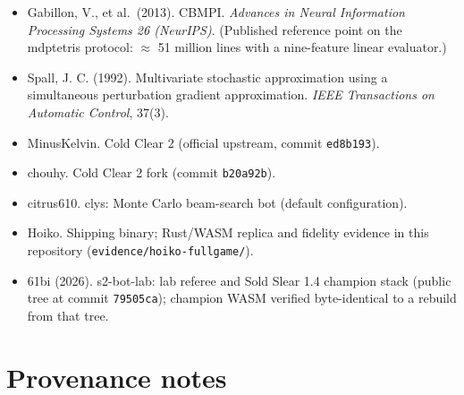 \documentclass[
  11pt,
]{article}
\providecommand{\tightlist}{%
  \setlength{\itemsep}{0pt}\setlength{\parskip}{0pt}}
\begin{document}
\begin{itemize}
\tightlist
\item
  Gabillon, V., et al.~(2013). CBMPI. \emph{Advances in Neural
  Information Processing Systems 26 (NeurIPS)}. (Published reference
  point on the mdptetris protocol: \(\approx\) 51 million lines with a
  nine-feature linear evaluator.)
\item
  Spall, J. C. (1992). Multivariate stochastic approximation using a
  simultaneous perturbation gradient approximation. \emph{IEEE
  Transactions on Automatic Control}, 37(3).
\item
  MinusKelvin. Cold Clear 2 (official upstream, commit
  \texttt{ed8b193}).
\item
  chouhy. Cold Clear 2 fork (commit \texttt{b20a92b}).
\item
  citrus610. clys: Monte Carlo beam-search bot (default configuration).
\item
  Hoiko. Shipping binary; Rust/WASM replica and fidelity evidence in
  this repository (\texttt{evidence/hoiko-fullgame/}).
\item
  61bi (2026). s2-bot-lab: lab referee and Sold Slear 1.4 champion stack
  (public tree at commit \texttt{79505ca}); champion WASM verified
  byte-identical to a rebuild from that tree.
\end{itemize}

\section{Provenance notes}\label{provenance-notes}
\end{document}

